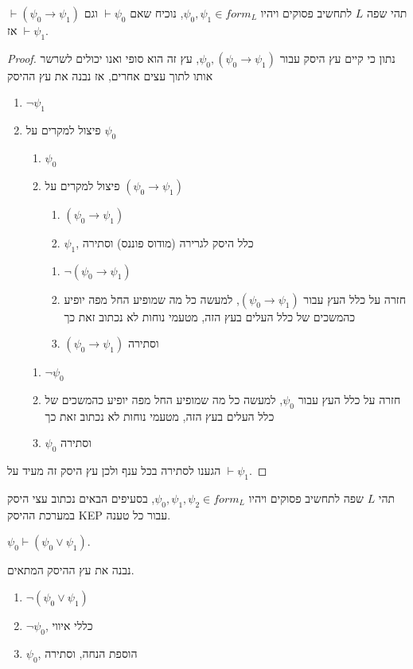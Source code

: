 \question{}
תהי שפה $L$ לתחשיב פסוקים ויהיו $\psi_0, \psi_1 \in form_L$, נוכיח שאם $\vdash \psi_0$ וגם $\vdash (\psi_0 \to \psi_1)$ אז $\vdash \psi_1$.
\begin{proof}
	נתון כי קיים עץ היסק עבור $\psi_0, (\psi_0 \to \psi_1)$, עץ זה הוא סופי ואנו יכולים לשרשר אותו לתוך עצים אחרים, אז נבנה את עץ ההיסק
	\begin{enumerate}
		\item $\lnot \psi_1$
		\item פיצול למקרים על $\psi_0$
			\begin{enumerate}
				\item $\psi_0$
				\item פיצול למקרים על $(\psi_0 \to \psi_1)$
					\begin{enumerate}
						\item $(\psi_0 \to \psi_1)$
						\item $\psi_1$, כלל היסק לגרירה (מודוס פוננס) וסתירה
					\end{enumerate}
					\begin{enumerate}
						\item $\lnot (\psi_0 \to \psi_1)$
						\item חזרה על כלל העץ עבור $(\psi_0 \to \psi_1)$, למעשה כל מה שמופיע החל מפה יופיע כהמשכים של כלל העלים בעץ הזה, מטעמי נוחות לא נכתוב זאת כך
						\item $(\psi_0 \to \psi_1)$ וסתירה
					\end{enumerate}
			\end{enumerate}
			\begin{enumerate}
				\item $\lnot \psi_0$
				\item חזרה על כלל העץ עבור $\psi_0$, למעשה כל מה שמופיע החל מפה יופיע כהמשכים של כלל העלים בעץ הזה, מטעמי נוחות לא נכתוב זאת כך
				\item $\psi_0$ וסתירה
			\end{enumerate}
	\end{enumerate}
	הגענו לסתירה בכל ענף ולכן עץ היסק זה מעיד על $\vdash \psi_1$.
\end{proof}

\question{}
תהי $L$ שפה לתחשיב פסוקים ויהיו $\psi_0, \psi_1, \psi_2 \in form_L$, בסעיפים הבאים נכתוב עצי היסק במערכת ההיסק KEP עבור כל טענה.

\subquestion{}
$\psi_0 \vdash (\psi_0 \lor \psi_1)$.
\begin{solution}
	נבנה את עץ ההיסק המתאים.
	\begin{enumerate}
		\item $\lnot (\psi_0 \lor \psi_1)$
		\item $\lnot \psi_0$, כללי איווי
		\item $\psi_0$, הוספת הנחה, וסתירה
	\end{enumerate}
\end{solution}


